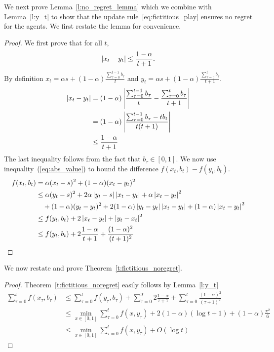 We next prove Lemma~\ref{l:no_regret_lemma} which we combine with
Lemma~\ref{l:y_t} to show that the update rule~\ref{eq:fictitious_play}
ensures no regret for the agents. We first restate the lemma for
convenience.
\begin{proof}
  We first prove that for all $t$,
  \begin{equation}\label{eq:abs_value}
    \left|x_t - y_t \right| \leq \frac{1-\alpha}{t+1}.
  \end{equation}
  By definition
  \(x_t = \alpha s + (1-\alpha)\frac{\sum_{\tau = 0}^{t-1} b_\tau}{t}\)
  and
  \( y_t = \alpha s + (1-\alpha)\frac{\sum_{\tau = 0}^t b_\tau}{t+1}\).
  \begin{align*}
    \left|x_t - y_t\right|
    &=
    (1-\alpha)\left|\frac{\sum_{\tau = 0}^{t-1}b_\tau}{t}
    - \frac{\sum_{\tau = 0}^t b_\tau}{t+1}\right|\\
    &=
    (1-\alpha)\left|\frac{\sum_{\tau = 0}^{t-1}b_\tau -tb_t}{t(t+1)}\right|\\
    &\leq
    \frac{1-\alpha}{t+1}
  \end{align*}
  The last inequality follows from the fact that $b_\tau \in [0,1]$.
  We now use inequality~(\ref{eq:abs_value}) to bound the difference
  \( f(x_t,b_t) - f(y_t,b_t) \).
  \begin{align*}
    f(x_t,b_t)
    &=
    \alpha(x_t - s)^2 + (1 - \alpha)(x_t - y_t)^2 \\
    &\leq
    \alpha(y_t - s)^2 + 2\alpha\left|y_t -
    s\right|\left|x_t - y_t\right| + \alpha \left|x_t - y_t\right|^2 \\
    &\quad + (1-\alpha)(y_t - y_t)^2 +
    2(1-\alpha)\left|y_t - y_t\right|\left|x_t-y_t\right| + (1 - \alpha)\left|x_t - y_t\right|^2\\
    &\leq
    f(y_t,b_t) + 2\left|x_t - y_t\right| + \left|y_t - x_t\right|^2\\
    &\leq
    f(y_t,b_t) + 2\frac{1-\alpha}{t+1} + \frac{(1-\alpha)^2}{(t+1)^2}
  \end{align*}
\end{proof}
We now restate and prove Theorem~\ref{t:fictitious_noregret}.
\begin{proof}
 Theorem~\ref{t:fictitious_noregret} easily follows by Lemma~\ref{l:y_t}
\begin{align*}
  \sum_{\tau=0}^t f(x_\tau,b_\tau)
  &\leq
  \sum_{\tau=0}^t f(y_\tau,b_\tau) + \sum_{\tau=0}^T 2\frac{1-\alpha}{\tau+1} +
  \sum_{\tau=0}^t \frac{(1-\alpha)^2}{(\tau+1)^2}\\
  &\leq
  \min_{ x \in [0,1]} \sum_{\tau=0}^t f(x,y_\tau) +
  2(1-\alpha)(\log t + 1) + (1-\alpha)\frac{\pi^2}{6}\\
  &\leq
  \min_{ x \in [0,1]} \sum_{\tau=0}^t f(x,y_\tau) + O(\log t)
\end{align*}

\end{proof}
